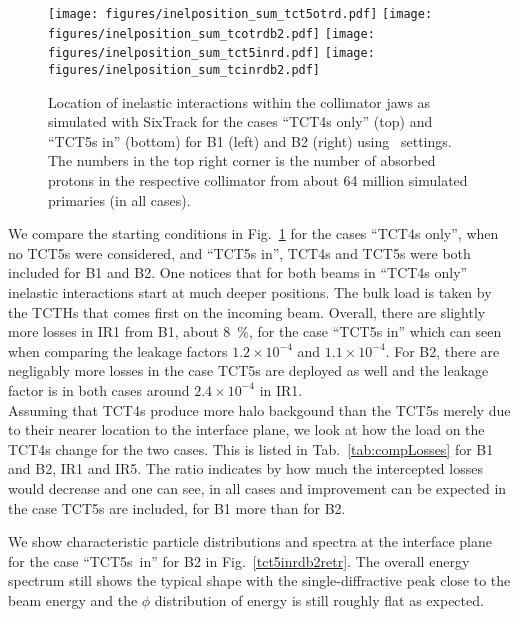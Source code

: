 \begin{figure}%
\begin{center}
\texttt{[image: figures/inelposition\_sum\_tct5otrd.pdf]}
\texttt{[image: figures/inelposition\_sum\_tcotrdb2.pdf]}
\texttt{[image: figures/inelposition\_sum\_tct5inrd.pdf]}
\texttt{[image: figures/inelposition\_sum\_tcinrdb2.pdf]}
\end{center}
\vspace{-0.6cm}
 \caption{Location of inelastic interactions within the collimator jaws as simulated with SixTrack for the cases ``TCT4s only'' (top) and ``TCT5s in'' (bottom) for B1 (left) and B2 (right) using \twosigmaret~settings. The numbers in the top right corner is the number of absorbed protons in the respective collimator from about 64 million simulated primaries (in all cases).
  \label{inelHLtctsInOut}}
\end{figure}

We compare the starting conditions in Fig.~\ref{inelHLtctsInOut} for the cases ``TCT4s only'', when no TCT5s were considered, and ``TCT5s in'', TCT4s and TCT5s were both included for B1 and B2. One notices that for both beams in ``TCT4s only'' inelastic interactions start at much deeper positions. The bulk load is taken by the TCTHs that comes first on the incoming beam. Overall, there are slightly more losses in IR1 from B1, about 8~\%, for the case ``TCT5s in'' which can seen when comparing the leakage factors $1.2 \times 10^{-4}$ and $1.1 \times 10^{-4}$. For B2, there are negligably more losses in the case TCT5s are deployed as well and the leakage factor is in both cases around $2.4 \times 10^{-4}$ in IR1.\\

Assuming that TCT4s produce more halo backgound than the TCT5s merely due to their nearer location to the interface plane, we look at how the load on the TCT4s change for the two cases. This is listed in Tab.~\ref{tab:compLosses} for B1 and B2, IR1 and IR5. The ratio indicates by how much the intercepted losses would decrease and one can see, in all cases and improvement can be expected in the case TCT5s are included, for B1 more than for B2.


We show characteristic particle distributions and spectra at the interface plane for the case ``TCT5s~in'' for B2 in Fig.~\ref{tct5inrdb2retr}. The overall energy spectrum still shows the typical shape with the single-diffractive peak close to the beam energy and the $\phi$ distribution of energy is still roughly flat as expected.

